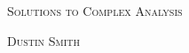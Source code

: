 \documentclass[dvipsnames]{article}%
\begin{document}
\begin{center}
  \begin{center}
  \vspace*{\fill}
  \textsc{\LARGE Solutions to Complex Analysis}
  \bigskip

  \textsc{\LARGE Dustin Smith}
  \vspace*{\fill}
\end{center}
\end{center}

\newpage

\tableofcontents

\newpage


\end{document}
